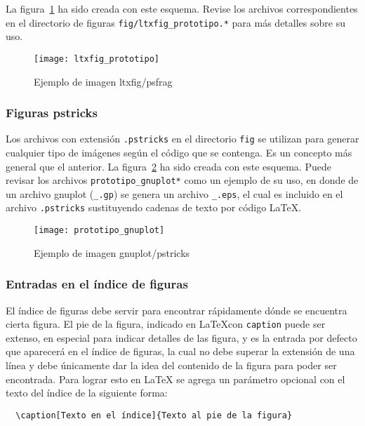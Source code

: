 La figura~\ref{fig:ltxfig} ha sido creada con este esquema.  Revise los
archivos correspondientes en el directorio de figuras
\texttt{fig/ltxfig\_prototipo.*} para más detalles sobre su uso.

\begin{figure}[htb]
  \centering
  \texttt{[image: ltxfig\_prototipo]}
  \caption{Ejemplo de imagen ltxfig/psfrag}
  \label{fig:ltxfig}
\end{figure}

\subsubsection{Figuras pstricks}  

Los archivos con extensión \texttt{.pstricks} en el directorio \texttt{fig} se
utilizan para generar cualquier tipo de imágenes según el código que se
contenga.  Es un concepto más general que el anterior.  La
figura~\ref{fig:pstricks} ha sido creada con este esquema.  Puede revisar los
archivos \texttt{prototipo\_gnuplot*} como un ejemplo de su uso, en donde de un
archivo gnuplot (\texttt{\_.gp}) se genera un archivo \texttt{\_.eps}, el cual
es incluido en el archivo \texttt{.pstricks} sustituyendo cadenas de texto por
código LaTeX.

\begin{figure}[htb]
  \centering
  \texttt{[image: prototipo\_gnuplot]}
  \caption{Ejemplo de imagen gnuplot/pstricks}
  \label{fig:pstricks}
\end{figure}

\subsubsection{Entradas en el índice de figuras}

El índice de figuras debe servir para encontrar rápidamente dónde se
encuentra cierta figura.  El pie de la figura, indicado en \LaTeX con
\texttt{caption} puede ser extenso, en especial para indicar detalles
de las figura, y es la entrada por defecto que aparecerá en el índice
de figuras, la cual no debe superar la extensión de una línea y debe
únicamente dar la idea del contenido de la figura para poder ser
encontrada.  Para lograr esto en \LaTeX{} se agrega un parámetro
opcional con el texto del índice de la siguiente forma:
\begin{verbatim}
  \caption[Texto en el índice]{Texto al pie de la figura}
\end{verbatim}

